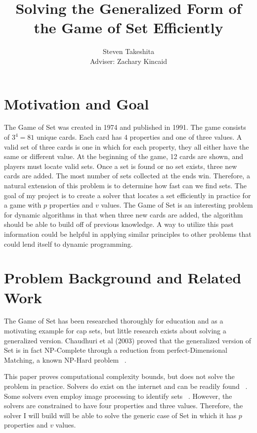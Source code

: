 \documentclass[12pt]{article}%
\begin{document}
\title{Solving the Generalized Form of the Game of Set Efficiently}

\author{Steven Takeshita\\Adviser: Zachary Kincaid}

\date{}
\maketitle


\section*{Motivation and Goal}

\hspace{5mm}
The Game of Set was created in 1974 and published in 1991. The game consists of $3^4 = 81$ unique cards. Each card has 4 properties and one of three values. A valid set of three cards is one in which for each property, they all either have the same or different value. At the beginning of the game, 12 cards are shown, and players must locate valid sets. Once a set is found or no set exists, three new cards are added. The most number of sets collected at the ends win. Therefore, a natural extension of this problem is to determine how fast can we find sets. The goal of my project is to create a solver that locates a set efficiently in practice for a game with $p$ properties and $v$ values. The Game of Set is an interesting problem for dynamic algorithms in that when three new cards are added, the algorithm should be able to build off of previous knowledge. A way to utilize this past information could be helpful in applying similar principles to other problems that could lend itself to dynamic programming. 


\section*{Problem Background and Related Work}

\hspace{5mm}
The Game of Set has been researched thoroughly for education and as a motivating example for cap sets, but little research exists about solving a generalized version. Chaudhuri et al (2003) proved that the generalized version of Set is in fact NP-Complete through a reduction from perfect-Dimensional Matching, a known NP-Hard problem ~\cite{chaudhuri}.  

This paper proves computational complexity bounds, but does not solve the problem in practice. Solvers do exist on the internet and can be readily found ~\cite{nolte}. Some solvers even employ image processing to identify sets ~\cite{jorquera}. However, the solvers are constrained to have four properties and three values. Therefore, the solver I will build will be able to solve the generic case of Set in which it has $p$ properties and $v$ values.  
\end{document}
